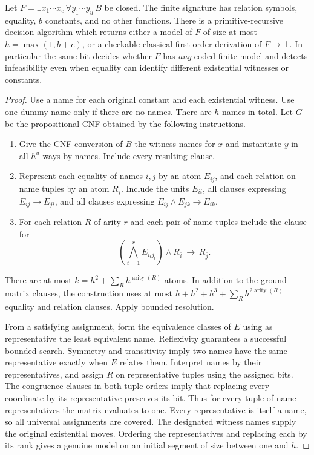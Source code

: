 \begin{theorem}
\label{thm:bsr}
Let $F=\exists x_1\cdots x_e\,\forall y_1\cdots y_u\,B$ be closed. The finite signature has relation symbols, equality, $b$ constants, and no other functions. There is a primitive-recursive decision algorithm which returns either a model of $F$ of size at most $h=\max(1,b+e)$, or a checkable classical first-order derivation of $F\to\bot$. In particular the same bit decides whether $F$ has \emph{any} coded finite model and detects infeasibility even when equality can identify different existential witnesses or constants.
\end{theorem}
\begin{proof}
Use a name for each original constant and each existential witness. Use one dummy name only if there are no names. There are $h$ names in total. Let $G$ be the propositional CNF obtained by the following instructions.
\begin{enumerate}
\item Give the CNF conversion of $B$ the witness names for $\bar x$ and instantiate $\bar y$ in all $h^u$ ways by names. Include every resulting clause.
\item Represent each equality of names $i,j$ by an atom $E_{ij}$, and each relation on name tuples by an atom $R_{\bar i}$. Include the units $E_{ii}$, all clauses expressing $E_{ij}\to E_{ji}$, and all clauses expressing $E_{ij}\wedge E_{jk}\to E_{ik}$.
\item For each relation $R$ of arity $r$ and each pair of name tuples include the clause for
\[
  \left(\bigwedge_{t=1}^r E_{i_t j_t}\right)\wedge R_{\bar i}
  \ \longrightarrow\ R_{\bar j}.
\]
\end{enumerate}
There are at most $k=h^2+\sum_R h^{\operatorname{arity}(R)}$ atoms. In addition to the ground matrix clauses, the construction uses at most $h+h^2+h^3+\sum_R h^{2\operatorname{arity}(R)}$ equality and relation clauses. Apply bounded resolution.

From a satisfying assignment, form the equivalence classes of $E$ using as representative the least equivalent name. Reflexivity guarantees a successful bounded search. Symmetry and transitivity imply two names have the same representative exactly when $E$ relates them. Interpret names by their representatives, and assign $R$ on representative tuples using the assigned bits. The congruence clauses in both tuple orders imply that replacing every coordinate by its representative preserves its bit. Thus for every tuple of name representatives the matrix evaluates to one. Every representative is itself a name, so all universal assignments are covered. The designated witness names supply the original existential moves. Ordering the representatives and replacing each by its rank gives a genuine model on an initial segment of size between one and $h$.


\end{proof}
